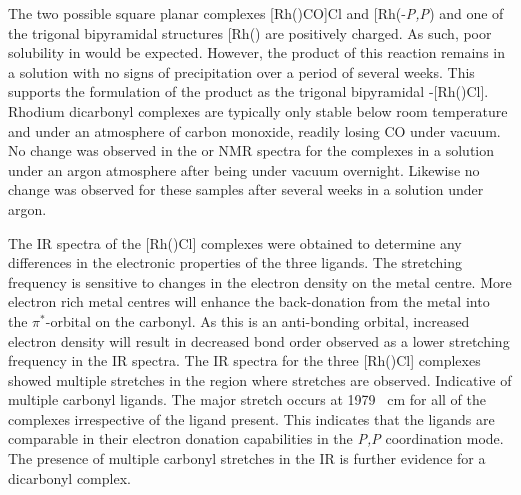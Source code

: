 The two possible square planar complexes [Rh(\tBuxantphosk)CO]Cl and [Rh(\tBuxantphos-\dento{}\emph{P,P}\textprime)\ce{(CO)2]Cl} and one of the trigonal bipyramidal structures [Rh(\tBuxantphosk)\ce{(CO)2]Cl} are positively charged.  As such, poor solubility in  would be expected.  However, the product of this reaction remains in a  solution with no signs of precipitation over a period of several weeks.  This supports the formulation of the product as the trigonal bipyramidal \trans-[Rh(\tBuxantphos)Cl].  Rhodium dicarbonyl complexes are typically only stable below room temperature and under an atmosphere of carbon monoxide, readily losing CO under vacuum.\cite{Sanger1984, Sanger1985}  No change was observed in the \phosphorus{} or \proton{} NMR spectra for the complexes in a  solution under an argon atmosphere after being under vacuum overnight.  Likewise no change was observed for these samples after several weeks in a  solution under argon.  

The \gls{IR} spectra of the [Rh(\tBuxantphos)Cl] complexes were obtained to determine any differences in the electronic properties of the three ligands.  The  stretching frequency is sensitive to changes in the electron density on the metal centre.  More electron rich metal centres will enhance the back-donation from the metal into the $\pi^*$-orbital on the carbonyl.  As this is an anti-bonding orbital, increased electron density will result in decreased bond order observed as a lower  stretching frequency in the \gls{IR} spectra.  The \gls{IR} spectra for the three [Rh(\tBuxantphos)Cl] complexes showed multiple stretches in the region where  stretches are observed.  Indicative of multiple carbonyl ligands.  The major  stretch occurs at 1979 \si{\per\centi\metre} for all of the complexes irrespective of the \tBuxantphos{} ligand present.  This indicates that the ligands are comparable in their electron donation capabilities in the \dento{}\emph{P,P}\textprime{} coordination mode.  The presence of multiple carbonyl stretches in the \gls{IR} is further evidence for a dicarbonyl complex.  

